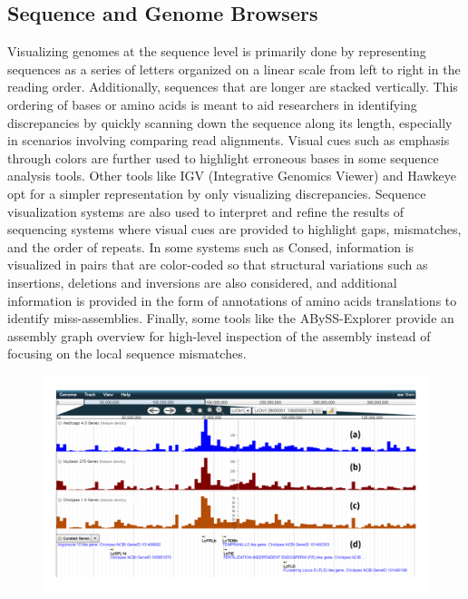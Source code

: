 \subsection{Sequence and Genome Browsers}
Visualizing genomes at the sequence level is primarily done by representing sequences
as a series of letters organized on a linear scale from left to right in the reading order. Additionally, sequences that are longer are stacked vertically. This ordering of bases or amino acids is meant to aid researchers in identifying discrepancies by quickly scanning down the sequence along its length, especially in scenarios involving comparing read alignments. Visual cues such as emphasis through colors are further used to highlight erroneous bases in some sequence analysis tools\cite{consed,ewing1998base}. Other tools like IGV (Integrative Genomics Viewer)\cite{thorvaldsdottir2013integrative} and Hawkeye\cite{schatz2007hawkeye} opt for a simpler representation by only visualizing discrepancies. Sequence visualization systems are also used to interpret and refine the results of sequencing systems where visual cues are provided to highlight gaps, mismatches, and the order of repeats\cite{bonfield1995new,consed}. In some systems such as Consed\cite{consed}, information is visualized in pairs that are color-coded so that structural variations such as insertions, deletions and inversions are also considered, and additional information is provided in the form of annotations of amino acids translations to identify miss-assemblies. Finally, some tools like the ABySS-Explorer provide an assembly graph overview for high-level inspection of the assembly instead of focusing on the local sequence mismatches\cite{nielsen2009abyss}. 


\begin{figure}
  \centering
  \includegraphics[width=1\linewidth]{images/ch_2_jbrowse.PNG}
  \label{fig:ch_2_jbrowse}
\end{figure}


